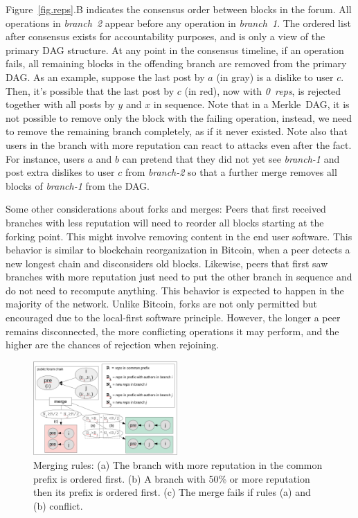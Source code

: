 \documentclass[10pt,journal,compsoc]{IEEEtran}
\newcommand{\nreps}[1] {\emph{#1~reps\xspace}}
\begin{document}
Figure~\ref{fig.reps}.B indicates the consensus order between blocks in the
forum.
All operations in \emph{branch~2} appear before any operation in
\emph{branch~1}.
The ordered list after consensus exists for accountability purposes, and is
only a view of the primary DAG structure.
At any point in the consensus timeline, if an operation fails, all remaining
blocks in the offending branch are removed from the primary DAG.
As an example, suppose the last post by $a$ (in gray) is a dislike to user $c$.
Then, it's possible that the last post by $c$ (in red), now with \nreps{0}, is
rejected together with all posts by $y$ and $x$ in sequence.
%
Note that in a Merkle~DAG, it is not possible to remove only the block with the
failing operation, instead, we need to remove the remaining branch completely,
as if it never existed.
%
Note also that users in the branch with more reputation can react to attacks
even after the fact.
For instance, users $a$ and $b$ can pretend that they did not yet see
\emph{branch-1} and post extra dislikes to user $c$ from \emph{branch-2} so
that a further merge removes all blocks of \emph{branch-1} from the DAG.

Some other considerations about forks and merges:
%
Peers that first received branches with less reputation will need to reorder
all blocks starting at the forking point.
This might involve removing content in the end user software.
This behavior is similar to blockchain reorganization in Bitcoin, when a peer
detects a new longest chain and disconsiders old blocks.
%
Likewise, peers that first saw branches with more reputation just need to put
the other branch in sequence and do not need to recompute anything.
This behavior is expected to happen in the majority of the network.
%
Unlike Bitcoin, forks are not only permitted but encouraged due to the
local-first software principle.
However, the longer a peer remains disconnected, the more conflicting
operations it may perform, and the higher are the chances of rejection when
rejoining.

\begin{figure}
\centering
\includegraphics[width=0.49\textwidth]{merge.png}
\caption{
    Merging rules:
    (a) The branch with more reputation in the common prefix is ordered first.
    (b) A branch with 50\% or more reputation then its prefix is ordered first.
    (c) The merge fails if rules (a) and (b) conflict.
}
\label{fig.merge}
\end{figure}
\end{document}
